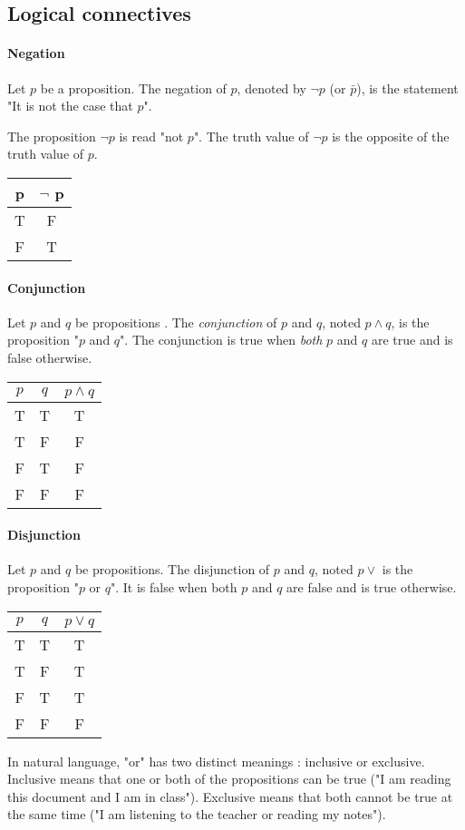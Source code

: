 \documentclass[10pt,a4paper]{book}
\begin{document}
\subsection{Logical connectives}
\paragraph*{Negation}
Let $p$ be a proposition. The negation of $p$, denoted by $\neg p$ (or $\bar{p}$), is the statement "It is not the case that $p$".\par 
The proposition $\neg p$ is read "not $p$". The truth value of $\neg p$ is the opposite of the truth value of $p$. \\
\begin{tabular}{ |c | c| }
\hline
 p & $\neg$ p \\
 \hline 
 T & F \\  
 F & T \\
 \hline
\end{tabular}
\paragraph*{Conjunction}
Let $p$ and $q$ be propositions . The \textit{conjunction} of $p$ and $q$, noted $p \land q$, is the proposition "$p$ and $q$". The conjunction is true when \textit{both} $p$ and $q$ are true and is false otherwise. \\
\begin{tabular}{ |c  c | c| }
\hline
 $p$ & $q$ & $p\land q$\\
 \hline
 T & T & T \\ 
 T & F & F \\  
 F & T & F \\
 F & F & F \\
 \hline
\end{tabular}
\paragraph*{Disjunction}
Let $p$ and $q$ be propositions. The disjunction of $p$ and $q$, noted $p\lor $ is the proposition "$p$ or $q$". It is false when both $p$ and $q$ are false and is true otherwise.\\
\begin{tabular}{ |c  c | c| }
\hline
 $p$ & $q$ & $p\lor q$\\
 \hline
 T & T & T \\ 
 T & F & T \\  
 F & T & T \\
 F & F & F \\
 \hline
\end{tabular}\par
In natural language, "or" has two distinct meanings : inclusive or exclusive. Inclusive means that one or both of the propositions can be true ("I am reading this document and I am in class"). Exclusive means that both cannot be true at the same time ("I am listening to the teacher or reading my notes").
\end{document}
